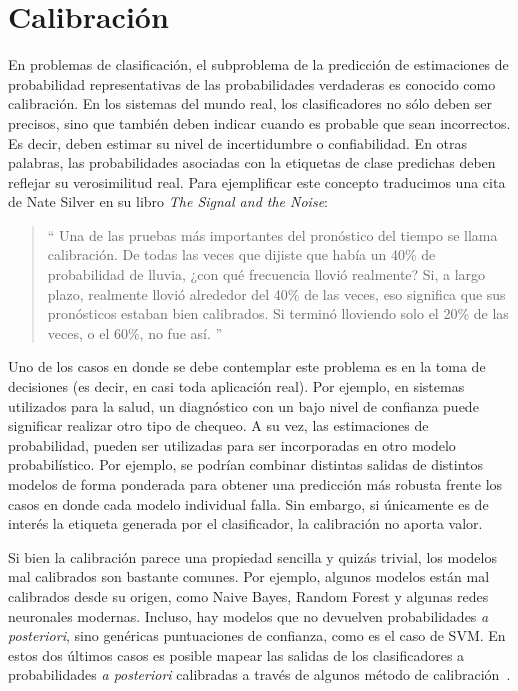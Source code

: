 \chapter{Calibración}\label{appendix:calibracion}

En problemas de clasificación, el subproblema de la predicción de estimaciones
de probabilidad representativas de las probabilidades verdaderas es conocido
como calibración. En los sistemas del mundo real, los clasificadores no sólo
deben ser precisos, sino que también deben indicar cuando es probable que sean
incorrectos. Es decir, deben estimar su nivel de incertidumbre o confiabilidad.
En otras palabras, las probabilidades asociadas con la etiquetas de clase
predichas deben reflejar su verosimilitud real. Para ejemplificar este concepto
traducimos una cita de Nate Silver en su libro {\it The Signal and the Noise\/}:  

\begin{quote}
`` Una de las pruebas más importantes del pronóstico del tiempo se llama
   calibración. De todas las veces que dijiste que había un 40\% de probabilidad
   de lluvia, ¿con qué frecuencia llovió realmente? Si, a largo plazo, realmente
   llovió alrededor del 40\% de las veces, eso significa que sus pronósticos
   estaban bien calibrados. Si terminó lloviendo solo el 20\% de las veces, o el
   60\%, no fue así. ''
\end{quote}

Uno de los casos en donde se debe contemplar este problema es en la toma de
decisiones (es decir, en casi toda aplicación real). Por ejemplo, en sistemas
utilizados para la salud, un diagnóstico con un bajo nivel de confianza puede
significar realizar otro tipo de chequeo. A su vez, las estimaciones de
probabilidad, pueden ser utilizadas para ser incorporadas en otro modelo
probabilístico. Por ejemplo, se podrían combinar distintas salidas de distintos
modelos de forma ponderada para obtener una predicción más robusta frente los
casos en donde cada modelo individual falla. Sin embargo, si únicamente es de
interés la etiqueta generada por el clasificador, la calibración no aporta
valor.

Si bien la calibración parece una propiedad sencilla y quizás trivial, los
modelos mal calibrados son bastante comunes. Por ejemplo, algunos modelos están
mal calibrados desde su origen, como Naive Bayes, Random Forest y algunas redes
neuronales modernas. Incluso, hay modelos que no devuelven probabilidades {\it a
posteriori}, sino genéricas puntuaciones de confianza, como es el caso de SVM.
En estos dos últimos casos es posible mapear las salidas de los clasificadores a
probabilidades {\it a posteriori\/} calibradas a través de algunos método de
calibración~\cite{platt1999probabilistic, zadrozny2002transforming,
niculescu2005predicting, guo2017calibration}.

